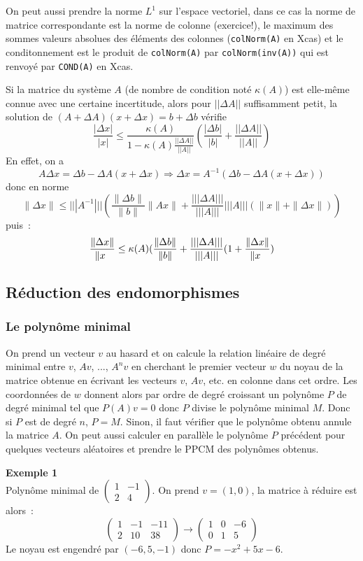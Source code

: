 \documentclass[a4paper,11pt]{article}
\begin{document}
\begin{giacjshere}
On peut aussi prendre la norme $L^1$ sur l'espace vectoriel, dans ce
cas la norme de matrice correspondante est la norme de colonne (exercice!),
le maximum des sommes valeurs absolues des \'el\'ements
des colonnes (\verb|colNorm(A)| en Xcas) et le conditonnement
est le produit de \verb|colNorm(A)| par \verb|colNorm(inv(A))|
qui est renvoy\'e par \verb|COND(A)| en Xcas.

Si la matrice du syst\`eme $A$ (de nombre de condition not\'e
$\kappa(A)$) est elle-m\^eme connue avec une
certaine incertitude, alors pour $||\Delta A||$ suffisamment petit,
la solution de
$(A+\Delta A)(x+\Delta x)=b+\Delta b$ v\'erifie
$$ \frac {|\Delta x |}{|x|}\leq
\frac{\kappa(A)}{1-\kappa(A)\frac{||\Delta A||}{||A||}}
\left(\frac{|\Delta b|}{|b|}+\frac{||\Delta A||}{||A||}
\right) $$
En effet, on a 
$$ A \Delta x =\Delta b - \Delta A(x+\Delta x)
\Rightarrow \Delta x = A^{-1}(\Delta b - \Delta A(x+\Delta x))  $$
donc en norme
$$ \| \Delta x \| \leq |||A^{-1}||| (\frac{\|\Delta b\|}{\|b\|}\|Ax\|
+ \frac{||| \Delta A |||}{|||A|||} |||A||| (\|x\|+\|\Delta x\|))$$
puis~:
$$ \frac{\| \Delta x \|}{\|x\\} \leq \kappa(A)
(\frac{\|\Delta b\|}{\|b\|}
+ \frac{||| \Delta A |||}{|||A|||} (1+\frac{\| \Delta x \|}{\|x\\}) $$



\subsection{R\'eduction des endomorphismes}
\subsubsection{Le polyn\^ome minimal}
On prend un vecteur $v$ au hasard et on calcule la relation lin\'eaire
de degr\'e minimal entre $v$, $Av$, ..., $A^nv$ en cherchant
le premier vecteur $w$ du noyau de la matrice obtenue en écrivant
les vecteurs $v$, $Av$, etc. en colonne dans cet ordre. Les
coordonnées de $w$ donnent alors par ordre de degré croissant
un polynôme $P$ de degr\'e minimal tel que $P(A)v=0$ donc
$P$ divise le polynôme minimal $M$. Donc si $P$ est de
degré $n$, $P=M$. Sinon, il faut v\'erifier que le polynôme obtenu 
annule la matrice $A$. On peut aussi calculer en parallèle le polynôme $P$
précédent pour quelques vecteurs aléatoires et prendre le PPCM des
polynômes obtenus.

{\bf Exemple 1}\\
Polynôme minimal de $\left(\begin{array}{cc} 1 & -1 \\ 2 & 4
\end{array}\right) $. On prend $v=(1,0)$, la matrice à réduire est
alors~:
\[ \left(\begin{array}{ccc} 1 & -1 & -11 \\ 2 & 10 & 38
\end{array}\right) \rightarrow 
\left(\begin{array}{ccc} 1 & 0 & -6 \\ 0 & 1 & 5
\end{array}\right)
\]
Le noyau est engendré par $(-6,5,-1)$ donc $P=-x^2+5x-6$.


\end{giacjshere}
\end{document}
